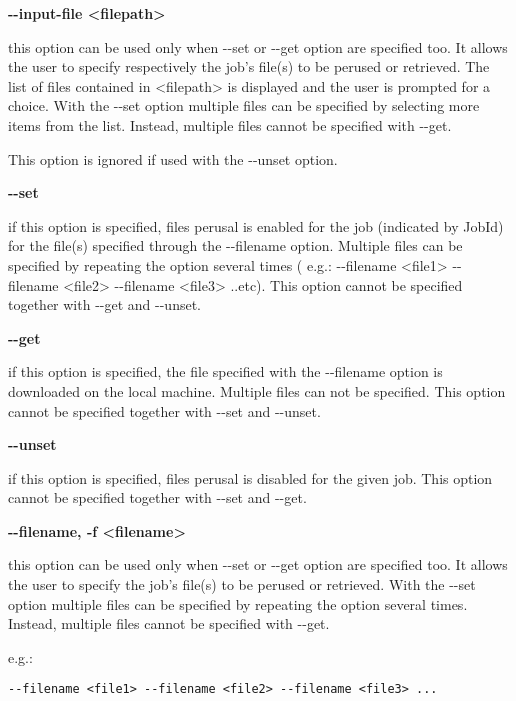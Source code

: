 \textbf{-{}-input-file <filepath>}

this option can be used only when -{}-set or -{}-get option are specified too. It
allows the user to specify respectively the job's file(s) to be perused or retrieved. The list of files contained in 
<filepath> is displayed and the user is prompted for a choice. With the -{}-set option multiple files can be 
specified by selecting more items from the list. Instead, multiple files cannot be specified with -{}-get.

This option is ignored if used with the -{}-unset option.





\textbf{-{}-set}

if this option is specified, files perusal is enabled for the job (indicated by JobId) for the file(s) 
specified through the -{}-filename option. Multiple files can be specified by repeating the option several 
times ( e.g.: -{}-filename <file1>  -{}-filename <file2>  -{}-filename <file3>  ..etc). This option cannot be 
specified together with -{}-get and -{}-unset.





\textbf{-{}-get}

if this option is specified, the file specified with the -{}-filename option is downloaded on the local machine. 
Multiple files can not be specified. This option cannot be specified together with -{}-set and -{}-unset.





\textbf{-{}-unset}

if this option is specified, files perusal is disabled for the given job.
This option cannot be specified together with -{}-set and -{}-get.





\textbf{-{}-filename, -f <filename>}

this option can be used only when -{}-set or -{}-get option are specified too. It allows the user to specify 
the job's file(s) to be perused or retrieved. With the -{}-set option multiple files can be specified by 
repeating the option several times. Instead, multiple files cannot be specified with -{}-get.

e.g.: 
\begin{verbatim}
--filename <file1> --filename <file2> --filename <file3> ...
\end{verbatim}


